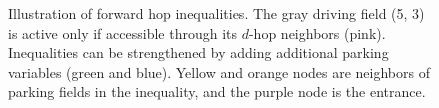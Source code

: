 \documentclass[10pt]{article}
\newcommand{\zeroneighborset}[2]{N_{#1#2}^{0}}
\newcommand{\ninetyneighborset}[2]{N_{#1#2}^{90}}
\newcommand{\entrancex}{p}
\newcommand{\entrancey}{q}
\newcommand{\vertexcutset}{V}
\newcommand{\twowaypartitioncomp}[1]{V_{#1}'}
\newcommand{\invzeroparksetcut}[3]{\mathcal{P}^{0}_{#1#2}(#3)}
\newcommand{\invninetyparksetcut}[3]{\mathcal{P}_{#1#2}^{90}(#3)}
\theoremstyle{definition}
\begin{document}
\begin{figure}[H]
    \vspace{-2mm}
\caption{Illustration of forward hop inequalities. The gray driving field (5, 3) is active only if accessible through its $d$-hop neighbors  (pink). Inequalities can be strengthened by adding additional parking variables (green and blue). Yellow and orange nodes are neighbors of parking fields in the inequality, and the purple node is the entrance.}
\label{fig:hop_connectivity}
\end{figure}
\end{document}
